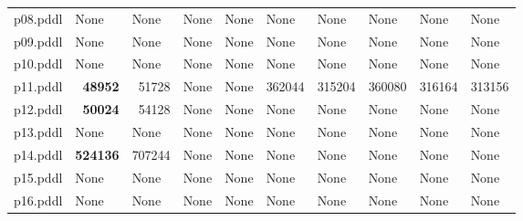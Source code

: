 \documentclass{article}
\begin{document}
\begin{tabular}{@{}lrrrrrrrrr@{}}
p08.pddl & \multicolumn{1}{|l|}{None} & \multicolumn{1}{|l|}{None} & \multicolumn{1}{|l|}{None} & \multicolumn{1}{|l|}{None} & \multicolumn{1}{|l|}{None} & \multicolumn{1}{|l|}{None} & \multicolumn{1}{|l|}{None} & \multicolumn{1}{|l|}{None} & \multicolumn{1}{|l|}{None} \\
p09.pddl & \multicolumn{1}{|l|}{None} & \multicolumn{1}{|l|}{None} & \multicolumn{1}{|l|}{None} & \multicolumn{1}{|l|}{None} & \multicolumn{1}{|l|}{None} & \multicolumn{1}{|l|}{None} & \multicolumn{1}{|l|}{None} & \multicolumn{1}{|l|}{None} & \multicolumn{1}{|l|}{None} \\
p10.pddl & \multicolumn{1}{|l|}{None} & \multicolumn{1}{|l|}{None} & \multicolumn{1}{|l|}{None} & \multicolumn{1}{|l|}{None} & \multicolumn{1}{|l|}{None} & \multicolumn{1}{|l|}{None} & \multicolumn{1}{|l|}{None} & \multicolumn{1}{|l|}{None} & \multicolumn{1}{|l|}{None} \\
p11.pddl & \textbf{48952} & 51728 & \multicolumn{1}{|l|}{None} & \multicolumn{1}{|l|}{None} & 362044 & 315204 & 360080 & 316164 & 313156 \\
p12.pddl & \textbf{50024} & 54128 & \multicolumn{1}{|l|}{None} & \multicolumn{1}{|l|}{None} & \multicolumn{1}{|l|}{None} & \multicolumn{1}{|l|}{None} & \multicolumn{1}{|l|}{None} & \multicolumn{1}{|l|}{None} & \multicolumn{1}{|l|}{None} \\
p13.pddl & \multicolumn{1}{|l|}{None} & \multicolumn{1}{|l|}{None} & \multicolumn{1}{|l|}{None} & \multicolumn{1}{|l|}{None} & \multicolumn{1}{|l|}{None} & \multicolumn{1}{|l|}{None} & \multicolumn{1}{|l|}{None} & \multicolumn{1}{|l|}{None} & \multicolumn{1}{|l|}{None} \\
p14.pddl & \textbf{524136} & 707244 & \multicolumn{1}{|l|}{None} & \multicolumn{1}{|l|}{None} & \multicolumn{1}{|l|}{None} & \multicolumn{1}{|l|}{None} & \multicolumn{1}{|l|}{None} & \multicolumn{1}{|l|}{None} & \multicolumn{1}{|l|}{None} \\
p15.pddl & \multicolumn{1}{|l|}{None} & \multicolumn{1}{|l|}{None} & \multicolumn{1}{|l|}{None} & \multicolumn{1}{|l|}{None} & \multicolumn{1}{|l|}{None} & \multicolumn{1}{|l|}{None} & \multicolumn{1}{|l|}{None} & \multicolumn{1}{|l|}{None} & \multicolumn{1}{|l|}{None} \\
p16.pddl & \multicolumn{1}{|l|}{None} & \multicolumn{1}{|l|}{None} & \multicolumn{1}{|l|}{None} & \multicolumn{1}{|l|}{None} & \multicolumn{1}{|l|}{None} & \multicolumn{1}{|l|}{None} & \multicolumn{1}{|l|}{None} & \multicolumn{1}{|l|}{None} & \multicolumn{1}{|l|}{None} \\

\end{tabular}
\end{document}
